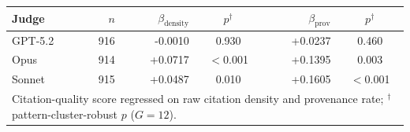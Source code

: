 \begin{tabular}{lrrcrc}
\toprule
Judge & $n$ & $\beta_{\mathrm{density}}$ & $p^{\dagger}$ & $\beta_{\mathrm{prov}}$ & $p^{\dagger}$\\
\midrule
GPT-5.2 & 916 & -0.0010 & 0.930 & +0.0237 & 0.460 \\
Opus & 914 & +0.0717 & $<$0.001 & +0.1395 & 0.003 \\
Sonnet & 915 & +0.0487 & 0.010 & +0.1605 & $<$0.001 \\
\bottomrule
\multicolumn{6}{l}{\footnotesize Citation-quality score regressed on raw citation density and provenance rate; $^{\dagger}$ pattern-cluster-robust $p$ ($G{=}12$).} \\
\end{tabular}